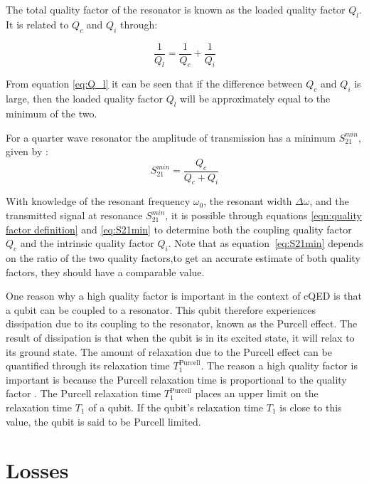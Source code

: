 \documentclass[12pt]{report}
\begin{document}
The total quality factor of the resonator is known as the loaded quality factor $Q_l$. It is related to $Q_c$ and $Q_i$ through:

\begin{equation}
    \frac{1}{Q_l} = \frac{1}{Q_c} + \frac{1}{Q_i}
    \label{eq:Q_l}
\end{equation}

From equation \ref{eq:Q_l} it can be seen that if the difference between $Q_c$ and $Q_i$ is large, then the loaded quality factor $Q_l$ will be approximately equal to the minimum of the two.


For a quarter wave resonator the amplitude of transmission has a minimum $S_{21}^{min}$, given by \cite[p.~29]{Mazin}:
\begin{equation}
    S_{21}^{min} = \frac{Q_c}{Q_c + Q_i}
    \label{eq:S21min}
\end{equation}

With knowledge of the resonant frequency $\omega_0$, the resonant width $\Delta \omega$, and the transmitted signal at resonance $S_{21}^{min}$, it is possible through equations \ref{eqn:quality factor definition} and \ref{eq:S21min} to determine both the coupling quality factor $Q_c$ and the intrinsic quality factor $Q_i$. Note that as equation~\ref{eq:S21min} depends on the ratio of the two quality factors,to get an accurate estimate of both quality factors, they should have a comparable value.

One reason why a high quality factor is important in the context of cQED is that a qubit can be coupled to a resonator. This qubit therefore experiences dissipation due to its coupling to the resonator, known as the Purcell effect. The result of dissipation is that when the qubit is in its excited state, it will relax to its ground state. The amount of relaxation due to the Purcell effect can be quantified through its relaxation time $T_1^\text{Purcell}$. The reason a high quality factor is important is because the Purcell relaxation time is proportional to the quality factor \cite[p.~22]{Geerlings}. The Purcell relaxation time $T_1^\text{Purcell}$ places an upper limit on the relaxation time $T_1$ of a qubit. If the qubit's relaxation time $T_1$ is close to this value, the qubit is said to be Purcell limited.



\section{Losses}
\end{document}
